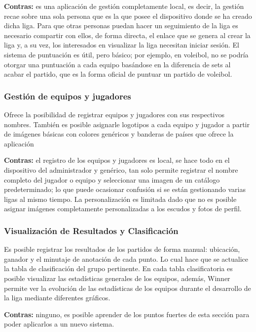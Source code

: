 \textbf{Contras:} es una aplicación de gestión completamente local, es decir, la gestión recae sobre una sola persona que es la que posee el dispositivo donde se ha creado dicha liga. Para que otras personas puedan hacer un seguimiento de la liga es necesario compartir con ellos, de forma directa, el enlace que se genera al crear la liga y, a su vez, los interesados en visualizar la liga necesitan iniciar sesión. El sistema de puntuación es útil, pero básico; por ejemplo, en voleibol, no se podría otorgar una puntuación a cada equipo basándose en la diferencia de sets al acabar el partido, que es la forma oficial de puntuar un partido de voleibol.

\subsubsection*{Gestión de equipos y jugadores}

Ofrece la posibilidad de registrar equipos y jugadores con sus respectivos nombres. También es posible asignarle logotipos a cada equipo y jugador a partir de imágenes básicas con colores genéricos y banderas de países que ofrece la aplicación

\textbf{Contras:} el registro de los equipos y jugadores es local, se hace todo en el dispositivo del administrador y genérico, tan solo permite registrar el nombre completo del jugador o equipo y seleccionar una imagen de un catálogo predeterminado; lo que puede ocasionar confusión si se están gestionando varias ligas al mismo tiempo. La personalización es limitada dado que no es posible asignar imágenes completamente personalizadas a los escudos y fotos de perfil.

\subsubsection*{Visualización de Resultados y Clasificación}

Es posible registrar los resultados de los partidos de forma manual: ubicación, ganador y el minutaje de anotación de cada punto. Lo cual hace que se actualice la tabla de clasificación del grupo pertinente. En cada tabla clasificatoria es posible visualizar las estadísticas generales de los equipos, además, Winner permite ver la evolución de las estadísticas de los equipos durante el desarrollo de la liga mediante diferentes gráficos.

\textbf{Contras:} ninguno, es posible aprender de los puntos fuertes de esta sección para poder aplicarlos a un nuevo sistema.

